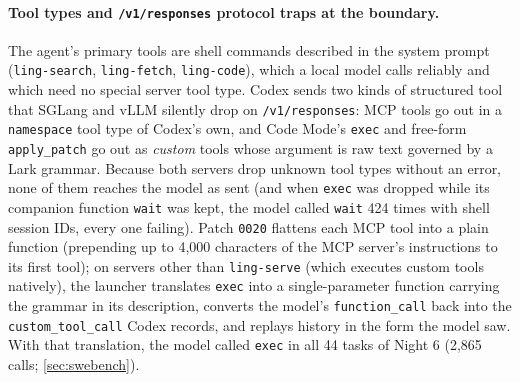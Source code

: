 \documentclass[11pt]{article}
\newcommand{\code}[1]{\texttt{#1}}
\begin{document}
\paragraph{Tool types and \code{/v1/responses} protocol traps at the boundary.} The agent's primary
tools are shell commands described in the system prompt (\code{ling-search}, \code{ling-fetch},
\code{ling-code}), which a local model calls reliably and which need no special server tool type.
Codex sends two kinds of structured tool that SGLang and vLLM silently drop on
\code{/v1/responses}: MCP tools go out in a \code{namespace} tool type of Codex's own, and Code
Mode's \code{exec} and free-form \code{apply\_patch} go out as \emph{custom} tools whose argument is
raw text governed by a Lark grammar. Because both servers drop unknown tool types without an error,
none of them reaches the model as sent (and when \code{exec} was dropped while its companion
function \code{wait} was kept, the model called \code{wait} 424 times with shell session IDs, every
one failing). Patch \code{0020} flattens each MCP tool into a plain function (prepending up to
4{,}000 characters of the MCP server's instructions to its first tool); on servers other than
\code{ling-serve} (which executes custom tools natively), the launcher translates \code{exec} into
a single-parameter function carrying the grammar in its description, converts the model's
\code{function\_call} back into the \code{custom\_tool\_call} Codex records, and replays history in
the form the model saw. With that translation, the model called \code{exec} in all 44 tasks of
Night 6 (2{,}865 calls; \cref{sec:swebench}).
\end{document}
